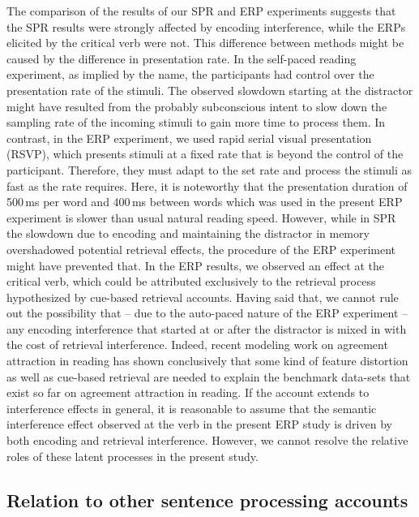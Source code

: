 \documentclass[a4paper, man, floatsintext]{apa7}
\begin{document}
The comparison of the results of our SPR and ERP experiments suggests that the SPR results were strongly affected by encoding interference, while the ERPs elicited by the critical verb were not. This difference between methods might be caused by the difference in presentation rate. In the self-paced reading experiment, as implied by the name, the participants had control over the presentation rate of the stimuli. The observed slowdown starting at the distractor  might have resulted from the probably subconscious intent to slow down the sampling rate of the incoming stimuli to gain more time to process them. In contrast, in the ERP experiment, we used rapid serial visual presentation (RSVP), which presents stimuli at a fixed rate that is beyond the control of the participant. Therefore, they must adapt to the set rate and process the stimuli as fast as the rate requires. Here, it is noteworthy that the presentation duration of 500\,ms per word and 400\,ms between words which was used in the present ERP experiment is slower than usual natural reading speed. However, while in SPR the slowdown due to encoding and maintaining the distractor in memory overshadowed potential retrieval effects, the procedure of the ERP experiment might have prevented that. In the ERP results, we observed an effect at the critical verb, which could be attributed exclusively to the retrieval process hypothesized by cue-based retrieval accounts. Having said that, we cannot rule out the possibility that -- due to the auto-paced nature of the ERP experiment -- any encoding interference that started at or after the distractor is mixed in with the cost of retrieval interference. Indeed, recent modeling work on agreement attraction in reading \parencite{Yadavetal2022} has shown conclusively that some kind of feature distortion as well as cue-based retrieval are needed to explain the benchmark data-sets that exist so far on agreement attraction in reading. If the  \textcite{Yadavetal2022} account extends to interference effects in general, 
it is reasonable to assume that the semantic interference effect observed at the verb in the present ERP study is driven by both encoding and retrieval interference. However, we cannot resolve the relative roles of these latent processes in the present study.

\subsection{Relation to other sentence processing accounts}
\end{document}
